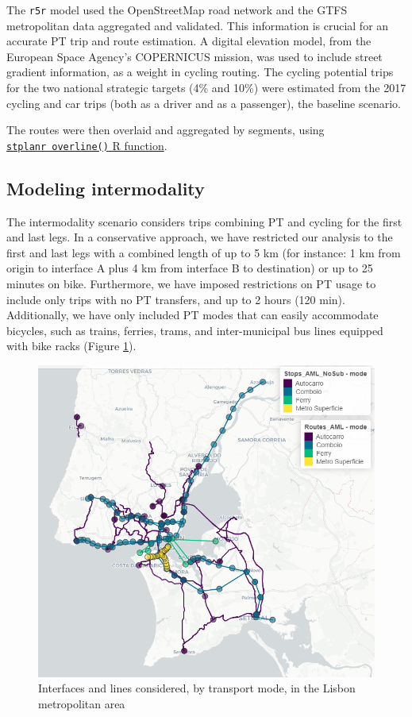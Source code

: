\documentclass[runningheads]{llncs}
\begin{document}
The \texttt{r5r} model used the OpenStreetMap road network and the GTFS
metropolitan data aggregated and validated. This information is crucial
for an accurate PT trip and route estimation. A digital elevation model,
from the European Space Agency's COPERNICUS mission, was used to include
street gradient information, as a weight in cycling routing. The cycling
potential trips for the two national strategic targets (4\% and 10\%)
were estimated from the 2017 cycling and car trips (both as a driver and
as a passenger), the baseline scenario.

The routes were then overlaid and aggregated by segments, using
\href{https://docs.ropensci.org/stplanr/reference/overline.html}{\texttt{stplanr\ overline()}
R function}.

\hypertarget{modeling-intermodality}{%
\subsection{Modeling intermodality}\label{modeling-intermodality}}

The intermodality scenario considers trips combining PT and cycling for
the first and last legs. In a conservative approach, we have restricted
our analysis to the first and last legs with a combined length of up to
5 km (for instance: 1 km from origin to interface A plus 4 km from
interface B to destination) or up to 25 minutes on bike. Furthermore, we
have imposed restrictions on PT usage to include only trips with no PT
transfers, and up to 2 hours (120 min). Additionally, we have only
included PT modes that can easily accommodate bicycles, such as trains,
ferries, trams, and inter-municipal bus lines equipped with bike racks
(Figure \ref{fig:map1}).

\begin{figure}

{\centering \includegraphics[width=0.6\linewidth,]{img/map1} 

}

\caption{Interfaces and lines considered, by transport mode, in the Lisbon metropolitan area}\label{fig:map1}
\end{figure}
\end{document}

